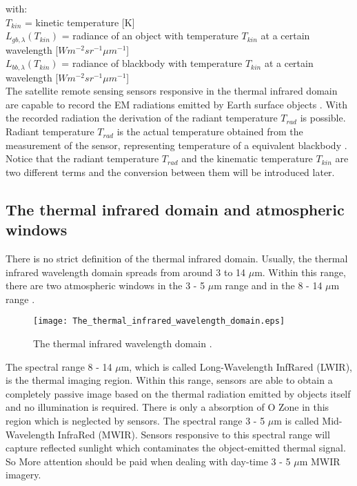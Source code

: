 \noindent with:\\
\indent $T_{kin}$ = kinetic temperature [K]\\
\indent $L_{gb, \lambda}(T_{kin})$ = radiance of an object with temperature $T_{kin}$ at a certain wavelength [$W m^{-2} sr^{-1} \mu m^{-1}$]\\
\indent $L_{bb, \lambda}(T_{kin})$ = radiance of blackbody with temperature $T_{kin}$ at a certain wavelength [$W m^{-2} sr^{-1} \mu m^{-1}$]\\

\noindent The satellite remote sensing sensors responsive in the thermal infrared domain are capable to record the EM radiations emitted by Earth surface objects \parencite{Reference204}. With the recorded radiation the derivation of the radiant temperature $T_{rad}$ is possible. Radiant temperature $T_{rad}$ is the actual temperature obtained from the measurement of the sensor, representing temperature of a equivalent blackbody \parencite{Reference206}. Notice that the radiant temperature $T_{rad}$ and the kinematic temperature $T_{kin}$ are two different terms and the conversion between them will be introduced later.\\


\subsection{The thermal infrared domain and atmospheric windows}
There is no strict definition of the thermal infrared domain. Usually, the thermal infrared wavelength domain spreads from around 3 to 14 $\mu$m. Within this range, there are two atmospheric windows in the 3 - 5 $\mu$m range and in the 8 - 14 $\mu$m range \parencite{Reference204}. \\

\begin{figure}[!htbp]
  \centering\texttt{[image: The\_thermal\_infrared\_wavelength\_domain.eps]}
  \caption{The thermal infrared wavelength domain \parencite{Reference204}.}
  \label{fig:TIRdomain}
\end{figure}

\noindent The spectral range 8 - 14 $\mu$m, which is called Long-Wavelength InfRared (LWIR), is the thermal imaging region. Within this range, sensors are able to obtain a completely passive image based on the thermal radiation emitted by objects itself and no illumination is required. There is only a absorption of O Zone in this region which is neglected by sensors. The spectral range 3 - 5 $\mu$m is called Mid-Wavelength InfraRed (MWIR). Sensors responsive to this spectral range will capture reflected sunlight which contaminates the object-emitted thermal signal. So More attention should be paid when dealing with day-time 3 - 5 $\mu$m MWIR imagery. \\

